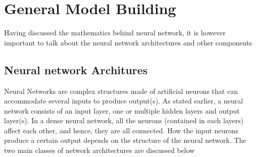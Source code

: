 \documentclass[a4paper,11pt,oneside]{book}
\begin{document}
 \section{General Model Building}
 Having discussed the mathematics behind neural network, it is however important to talk about the neural network architectures and other components
 \subsection{Neural network Architures}
 Neural Networks are complex structures made of artificial neurons that can accommodate several inputs to produce output(s). As stated earlier, a neural network consists of an input layer, one or multiple hidden layers and output layer(s). In a dense neural network, all the neurons (contained in each layers) affect each other, and hence, they are all connected. How the input neurons produce a certain output depends
 on the structure of the neural network. The two main classes of network architectures are discussed below
\end{document}
